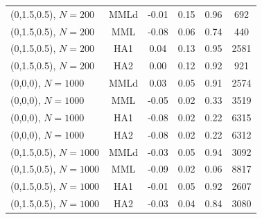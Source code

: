 \documentclass[12pt,fleqn]{article}
\begin{document}
\begin{table}[ht]
\begin{tabular}{lccccc}
  (0,1.5,0.5), $N=200$ & MMLd & -0.01 & 0.15 & 0.96 & 692  \\
  (0,1.5,0.5), $N=200$ & MML & -0.08 & 0.06 & 0.74 & 440 \\
  (0,1.5,0.5), $N=200$ & HA1 & 0.04 & 0.13 & 0.95 & 2581 \\
  (0,1.5,0.5), $N=200$ & HA2 & 0.00 & 0.12 & 0.92 & 921 \\
  (0,0,0), $N=1000$ & MMLd & 0.03 & 0.05 & 0.91 & 2574 \\
  (0,0,0), $N=1000$ & MML & -0.05 & 0.02 & 0.33 & 3519 \\
  (0,0,0), $N=1000$ & HA1 & -0.08 & 0.02 & 0.22 & 6315 \\
  (0,0,0), $N=1000$ & HA2 & -0.08 & 0.02 & 0.22 & 6312 \\
  (0,1.5,0.5), $N=1000$ & MMLd & -0.03 & 0.05 & 0.94 & 3092 \\
  (0,1.5,0.5), $N=1000$ & MML & -0.09 & 0.02 & 0.06 & 8817  \\
  (0,1.5,0.5), $N=1000$ & HA1 & -0.01 & 0.05 & 0.92 & 2607 \\
  (0,1.5,0.5), $N=1000$ & HA2 & -0.03 & 0.04 & 0.84 & 3080 \\
\hline
\end{tabular}
\end{table}

\end{document}
